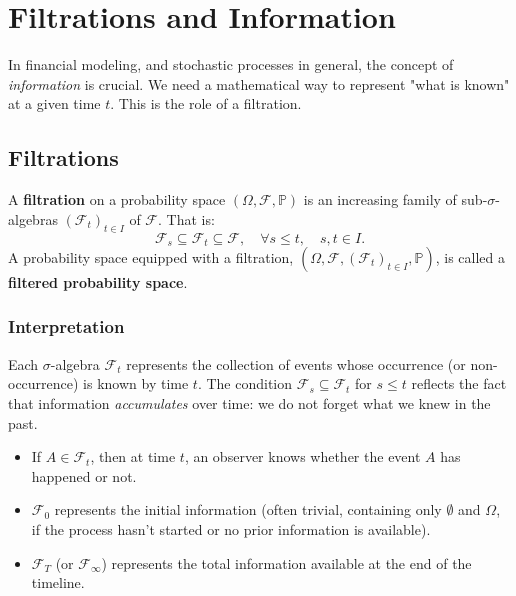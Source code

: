 \chapter{Filtrations and Information}

In financial modeling, and stochastic processes in general, the concept of \textit{information} is crucial. We need a mathematical way to represent "what is known" at a given time $t$. This is the role of a filtration.

\section{Filtrations}

\begin{definition}[Filtration]
A \textbf{filtration} on a probability space $(\Omega, \mathcal{F}, \mathbb{P})$ is an increasing family of sub-$\sigma$-algebras $(\mathcal{F}_t)_{t \in I}$ of $\mathcal{F}$. That is:
\[
\mathcal{F}_s \subseteq \mathcal{F}_t \subseteq \mathcal{F}, \quad \forall s \le t, \quad s, t \in I.
\]
A probability space equipped with a filtration, $(\Omega, \mathcal{F}, (\mathcal{F}_t)_{t \in I}, \mathbb{P})$, is called a \textbf{filtered probability space}.
\end{definition}

\subsection{Interpretation}
Each $\sigma$-algebra $\mathcal{F}_t$ represents the collection of events whose occurrence (or non-occurrence) is known by time $t$. The condition $\mathcal{F}_s \subseteq \mathcal{F}_t$ for $s \le t$ reflects the fact that information \textit{accumulates} over time: we do not forget what we knew in the past.
\begin{itemize}
    \item If $A \in \mathcal{F}_t$, then at time $t$, an observer knows whether the event $A$ has happened or not.
    \item $\mathcal{F}_0$ represents the initial information (often trivial, containing only $\emptyset$ and $\Omega$, if the process hasn't started or no prior information is available).
    \item $\mathcal{F}_T$ (or $\mathcal{F}_{\infty}$) represents the total information available at the end of the timeline.
\end{itemize}

